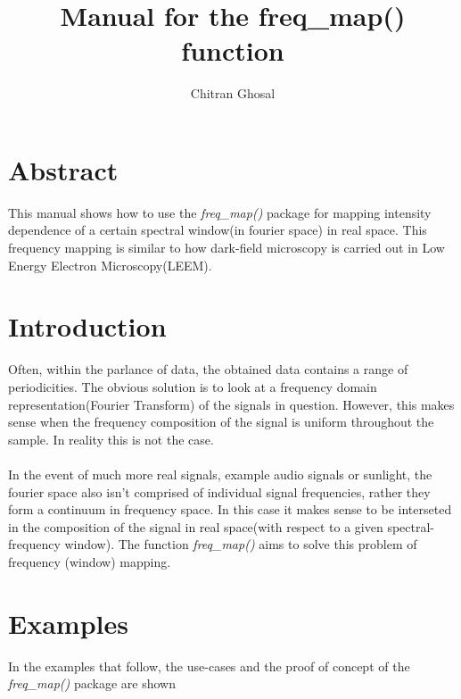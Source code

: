 \documentclass{article}
\title{\textbf{Manual for the freq\_map() function}}
\author{Chitran Ghosal}
\begin{document}
	\maketitle
	\section{Abstract}
	This manual shows how to use the \textit{freq\_map()} package for mapping intensity dependence of a certain spectral window(in fourier space) in real space. This frequency mapping is similar to how dark-field microscopy is carried out in Low Energy Electron Microscopy(LEEM).  
	\section{Introduction}
	Often, within the parlance of data, the obtained data contains a range of periodicities. The obvious solution is to look at a frequency domain representation(Fourier Transform) of the signals in question. However, this makes sense when the frequency composition of the signal is uniform throughout the sample. In reality this is not the case.\\
	\\
	In the event of much more real signals, example audio signals or sunlight, the fourier space also isn't comprised of individual signal frequencies, rather they form a continuum in frequency space. In this case it makes sense to be interseted in the composition of the signal in real space(with respect to a given spectral-frequency window). The function \textit{freq\_map()} aims to solve this problem of frequency (window) mapping.
	\section{Examples}
	In the examples that follow, the use-cases and the proof of concept of the \textit{freq\_map()} package are shown
\end{document}

